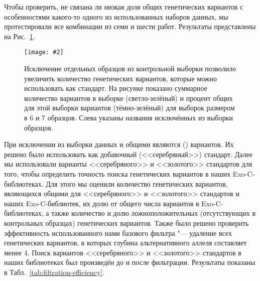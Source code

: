 \documentclass[a4paper,14pt]{extarticle}
\newcommand{\centerfigure}[5]
{\begin{figure}[#1]\centering\texttt{[image: \#2]}\caption{\label{#3}#4}\end{figure}}
\newcommand{\picref}[1]{Рис.~\ref{#1}}
\newcommand{\tableref}[1]{Табл.~\ref{#1}}
\begin{document}
Чтобы проверить, не связана ли низкая доля общих генетических вариантов с особенностями какого-то одного из использованных наборов данных, мы протестировали все комбинации из семи и шести работ.
Результаты представлены на \picref{fig:exclusion}.

\centerfigure{hp!}{Exclusion_6.pdf}{fig:exclusion}{Исключение отдельных образцов из контрольной выборки позволило увеличить количество генетических вариантов, которые можно использовать как стандарт. На рисунке показано суммарное количество вариантов в выборке (светло-зелёный) и процент общих для этой выборки вариантов (тёмно-зелёный) для выборок размером в 6 и 7 образцов. Слева указаны названия исключённых из выборки образцов.}{0.7}

При исключении из выборки данных \citeauthor{Banaszak_2018} и \citeauthor{Belaghzal_2017} общими являются  () вариантов.
Их решено было использовать как добавочный (<<серебряный>>) стандарт.
Далее мы использовали варианты <<серебряного>> и <<золотого>> стандартов для того, чтобы определить точность поиска генетических вариантов в наших Exo-C\hyp{}библиотеках.
Для этого мы оценили количество генетических вариантов, являющихся общими для <<серебряного>> и <<золотого>> стандартов и наших Exo-C\hyp{}библиотек, их долю от общего числа вариантов в Exo-C\hyp{}библиотеках, а также количество и долю ложноположительных (отсутствующих в контрольных образцах) генетических вариантов.
Также было решено проверить эффективность использованного нами базового фильтра "--- удаление всех генетических вариантов, в которых глубина альтернативного аллеля составляет менее 4.
Поиск вариантов <<серебряного>> и <<золотого>> стандартов в наших библиотеках был произведён до и после фильтрации.
Результаты показаны в \tableref{tab:filtration-efficiency}.
\end{document}
